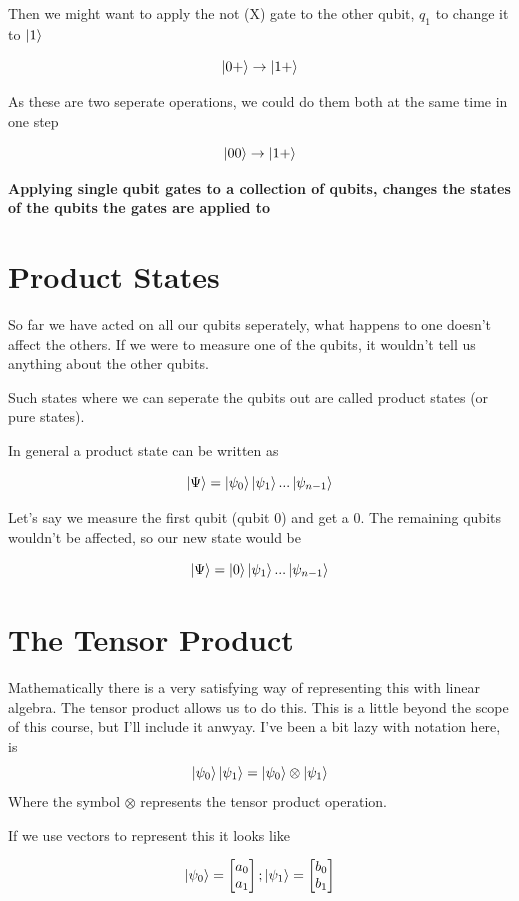 \documentclass{book}
\begin{document}
Then we might want to apply the not (X) gate to the other qubit, $q_1$ to change it to $\ket{1}$

$$ \ket{0+} \rightarrow \ket{1+} $$

As these are two seperate operations, we could do them both at the same time in one step 

$$  \ket{00} \rightarrow \ket{1+} $$

\textbf{Applying single qubit gates to a collection of qubits, changes the states of the qubits the gates are applied to}


\section{ Product States }

So far we have acted on all our qubits seperately, what happens to one doesn't affect the others. If we were to measure one of the qubits, it wouldn't tell us anything about the other qubits. 

Such states where we can seperate the qubits out are called product states (or pure states). 

In general a product state can be written as 

$$ \ket{\Psi} = \ket{\psi_0}\ket{\psi_1}...\ket{\psi_{n-1}}$$

Let's say we measure the first qubit (qubit 0) and get a 0. The remaining qubits wouldn't be affected, so our new state would be 

$$ \ket{\Psi} = \ket{0}\ket{\psi_1}...\ket{\psi_{n-1}}$$


\section{ The Tensor Product }

Mathematically there is a very satisfying way of representing this with linear algebra. The tensor product allows us to do this. This is a little beyond the scope of this course, but I'll include it anwyay. 
I've been a bit lazy with notation here, is
$$ \ket{\psi_0}\ket{\psi_1} = \ket{\psi_0} \otimes \ket{\psi_1} $$
Where the symbol $\otimes$ represents the tensor product operation. 

If we use vectors to represent this it looks like 

$$ \ket{\psi_0} = \begin{bmatrix} a_0 \\ a_1 \end{bmatrix} ; \ket{\psi_1} = \begin{bmatrix} b_0 \\ b_1 \end{bmatrix} $$
\end{document}

